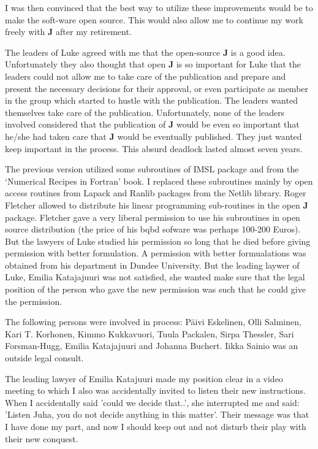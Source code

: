I was then convinced that the best way to utilize these improvements would be to
make the soft-ware open source. This would also allow me to continue my work freely
with \textbf{J} after my retirement.


The leaders of Luke agreed with me that the open-source \textbf{J} is a good idea.
Unfortunately they
also thought that open \textbf{J} is so important for Luke that the leaders could not
allow me to take care of the publication and prepare and present
the necessary decisions for their approval, or even participate as
member in the group which
started to hustle with the publication.
The leaders wanted themselves take care of the publication. Unfortunately, none
of the leaders involved
considered that the publication of \textbf{J} would be even so
important that he/she
had taken care that \textbf{J} would be eventually published.
They just wanted keep important
in the process. This absurd deadlock lasted almost seven years.

The previous version utilized some subroutines of IMSL package and from
the ‘Numerical Recipes in Fortran’ book. I replaced these subroutines mainly by
open access routines from Lapack and Ranlib packages from the Netlib library.
Roger Fletcher allowed to distribute his linear programming sub-routines in
the open \textbf{J} package. Fletcher gave a very liberal permission to use
his subroutines in open source distribution (the
price of his bqbd sofware was perhaps 100-200 Euros).
But the lawyers of Luke studied his permission
so long that he died before giving permission with better formulation.
A permission with
better formualations was obtained from his department in Dundee University.
But the leading
laywer of Luke, Emilia Katajajuuri was not satisfied, she wanted make
sure that the
legal position of the person
who gave the new permission was such that he could give the permission.



The following persons were involved in
process: Päivi Eskelinen, Olli Salminen, Kari T. Korhonen, Kimmo Kukkavuori,
Tuula Packalen, Sirpa Thessler, Sari Forsman-Hugg, Emilia Katajajuuri and Johanna
Buchert. Iikka Sainio was an outside legal consult.

The leading lawyer of Emilia Katajuuri made my position clear
in a video meeting to which I also was accidentally invited to
listen their new instructions.
When I accidentally said 'could we decide that..', she interrupted me and said:
'Listen Juha,
you do not decide anything in this matter'. Their message was that
I have done my part, and now
I should keep out and not disturb their play with their new conquest.

